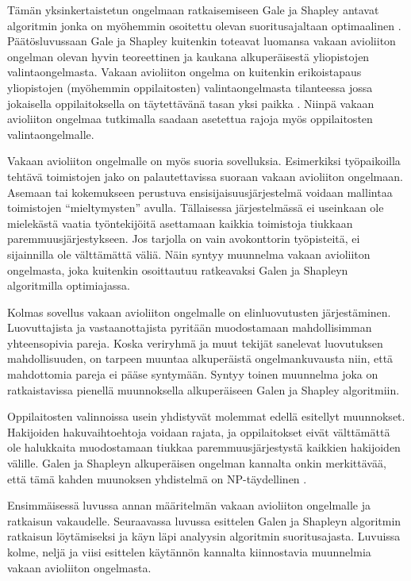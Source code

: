 \documentclass[gradu, twoside]{tktltiki}
\begin{document}
Tämän yksinkertaistetun ongelmaan ratkaisemiseen Gale ja Shapley
antavat algoritmin jonka on myöhemmin osoitettu olevan
suoritusajaltaan optimaalinen \cite{gusfield89} \cite{cheng89}.
Päätösluvussaan Gale ja Shapley kuitenkin toteavat luomansa vakaan
avioliiton ongelman olevan hyvin teoreettinen ja kaukana
alkuperäisestä yliopistojen valintaongelmasta. Vakaan avioliiton
ongelma on kuitenkin erikoistapaus yliopistojen (myöhemmin
oppilaitosten) valintaongelmasta tilanteessa jossa jokaisella
oppilaitoksella on täytettävänä tasan yksi paikka \cite{manlove02}.
Niinpä vakaan avioliiton ongelmaa tutkimalla saadaan asetettua rajoja
myös oppilaitosten valintaongelmalle.

Vakaan avioliiton ongelmalle on myös suoria sovelluksia. Esimerkiksi
työpaikoilla tehtävä toimistojen jako on palautettavissa suoraan
vakaan avioliiton ongelmaan. Asemaan tai kokemukseen perustuva
ensisijaisuusjärjestelmä voidaan mallintaa toimistojen
``mieltymysten'' avulla. Tällaisessa järjestelmässä ei useinkaan ole
mielekästä vaatia työntekijöitä asettamaan kaikkia toimistoja tiukkaan
paremmuusjärjestykseen. Jos tarjolla on vain avokonttorin työpisteitä,
ei sijainnilla ole välttämättä väliä. Näin syntyy muunnelma vakaan
avioliiton ongelmasta, joka kuitenkin osoittautuu ratkeavaksi Galen ja
Shapleyn algoritmilla optimiajassa.

Kolmas sovellus vakaan avioliiton ongelmalle on elinluovutusten
järjestäminen. Luovuttajista ja vastaanottajista pyritään muodostamaan
mahdollisimman yhteensopivia pareja. Koska veriryhmä ja muut tekijät
sanelevat luovutuksen mahdollisuuden, on tarpeen muuntaa alkuperäistä
ongelmankuvausta niin, että mahdottomia pareja ei pääse syntymään.
Syntyy toinen muunnelma joka on ratkaistavissa pienellä muunnoksella
alkuperäiseen Galen ja Shapley algoritmiin.

Oppilaitosten valinnoissa usein yhdistyvät molemmat edellä esitellyt
muunnokset. Hakijoiden hakuvaihtoehtoja voidaan rajata, ja
oppilaitokset eivät välttämättä ole halukkaita muodostamaan tiukkaa
paremmuusjärjestystä kaikkien hakijoiden välille. Galen ja Shapleyn
alkuperäisen ongelman kannalta onkin merkittävää, että tämä kahden
muunoksen yhdistelmä on NP-täydellinen \cite{manlove02}.

Ensimmäisessä luvussa annan määritelmän vakaan avioliiton ongelmalle
ja ratkaisun vakaudelle. Seuraavassa luvussa esittelen Galen ja
Shapleyn algoritmin ratkaisun löytämiseksi ja käyn läpi analyysin
algoritmin suoritusajasta. Luvuissa kolme, neljä ja viisi esittelen
käytännön kannalta kiinnostavia muunnelmia vakaan avioliiton
ongelmasta.
\end{document}
